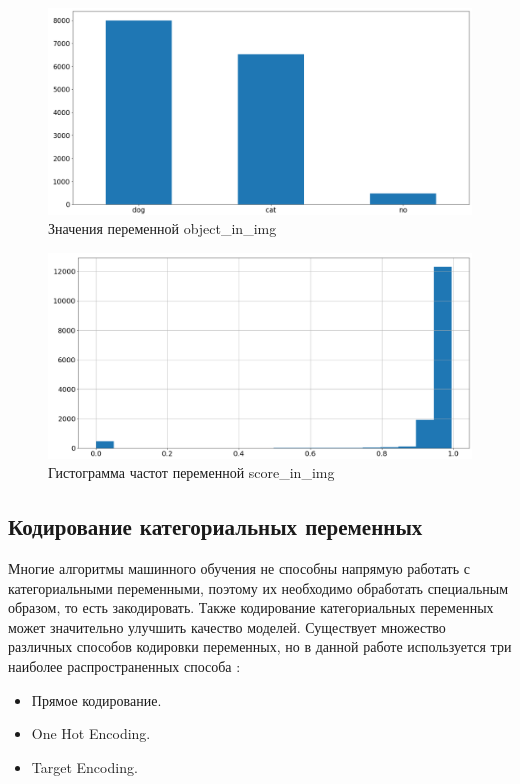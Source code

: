\documentclass[14pt]{mmcs_article}
\begin{document}
\begin{figure}[H]
	\centering
	\includegraphics[scale=0.48]{objectimg.png}
	\caption{Значения переменной object\_in\_img}\label{analyse:objectimg}
\end{figure}

\begin{figure}[H]
	\centering
	\includegraphics[scale=0.48]{scoreimg.png}
	\caption{Гистограмма частот переменной score\_in\_img}\label{analyse:scoreimg}
\end{figure}



\subsection{Кодирование категориальных переменных}

Многие алгоритмы машинного обучения не способны напрямую работать с категориальными переменными, поэтому их необходимо обработать специальным образом, то есть закодировать. Также кодирование категориальных переменных может значительно улучшить качество моделей. Существует множество различных способов кодировки переменных, но в данной работе используется три наиболее распространенных способа \cite{lib:encode}:
\begin{itemize}
	\item Прямое кодирование.
	\item One Hot Encoding.
	\item Target Encoding.
\end{itemize}
\end{document}
